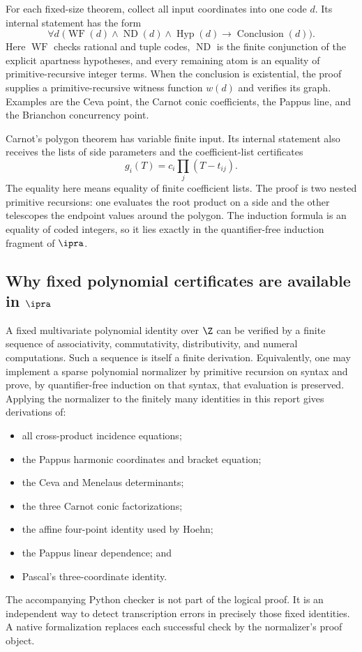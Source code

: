 For each fixed-size theorem, collect all input coordinates into one code
$d$.  Its internal statement has the form
\begin{equation}\label{eq:internal-fixed-shape}
 \forall d\;\bigl(\operatorname{WF}(d)\wedge
                    \operatorname{ND}(d)\wedge
                    \operatorname{Hyp}(d)
             \to \operatorname{Conclusion}(d)\bigr).
\end{equation}
Here $\operatorname{WF}$ checks rational and tuple codes,
$\operatorname{ND}$ is the finite conjunction of the explicit apartness
hypotheses, and every remaining atom is an equality of primitive-recursive
integer terms.  When the conclusion is existential, the proof supplies a
primitive-recursive witness function $w(d)$ and verifies its graph.  Examples
are the Ceva point, the Carnot conic coefficients, the Pappus line, and the
Brianchon concurrency point.

Carnot's polygon theorem has variable finite input.  Its internal statement
also receives the lists of side parameters and the coefficient-list
certificates
\[
 g_i(T)=c_i\prod_j(T-t_{ij}).
\]
The equality here means equality of finite coefficient lists.  The proof is
two nested primitive recursions: one evaluates the root product on a side and
the other telescopes the endpoint values around the polygon.  The induction
formula is an equality of coded integers, so it lies exactly in the
quantifier-free induction fragment of $\ipra$.

\subsection{Why fixed polynomial certificates are available in \texorpdfstring{$\ipra$}{iPRA}}

A fixed multivariate polynomial identity over $\Z$ can be verified by a
finite sequence of associativity, commutativity, distributivity, and numeral
computations.  Such a sequence is itself a finite derivation.  Equivalently,
one may implement a sparse polynomial normalizer by primitive recursion on
syntax and prove, by quantifier-free induction on that syntax, that evaluation
is preserved.  Applying the normalizer to the finitely many identities in
this report gives derivations of:
\begin{itemize}
\item all cross-product incidence equations;
\item the Pappus harmonic coordinates and bracket equation;
\item the Ceva and Menelaus determinants;
\item the three Carnot conic factorizations;
\item the affine four-point identity used by Hoehn;
\item the Pappus linear dependence; and
\item Pascal's three-coordinate identity.
\end{itemize}
The accompanying Python checker is not part of the logical proof.  It is an
independent way to detect transcription errors in precisely those fixed
identities.  A native formalization replaces each successful check by the
normalizer's proof object.


